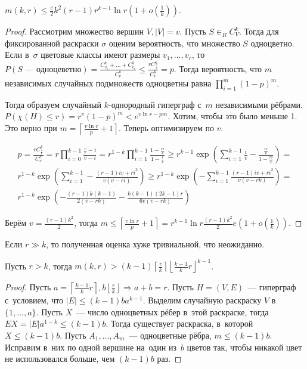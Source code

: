 \documentclass{article}
\begin{document}
\begin{lemma}
	$m(k, r) \le \frac{e}{2} k^2 (r-1) r^{k-1} \ln r (1 + o\left(\frac{1}{k}
	\right))$.
\end{lemma}
\begin{proof}
	Рассмотрим множество вершин $V, |V| = v$. Пусть $S \in_R C_V^k$. Тогда для
	фиксированной раскраски $\sigma$ оценим вероятность, что множество $S$
	одноцветно. Если в~$\sigma$ цветовые классы имеют размеры $v_1, \ldots, v_r$,
	то $P(S\text{~--- одноцеветно}) = \frac{C_{v_1}^k + \ldots + C_{v_r}^k}{C_v^k}
	\le \frac{r C_{\frac{v}{r}}^k}{C_v^k} = p$. Тогда вероятность, что $m$
	независимых случайных подмножеств одноцветны равна $\prod\limits_{i=1}^m
	(1-p)^m$.

	Тогда образуем случайный $k$-однородный гиперграф с~$m$ независимыми рёбрами.
	$P(\chi(H) \le r) = r^v (1-p)^m < e^{v \ln r - pm}$. Хотим, чтобы это было
	меньше 1. Это верно при $m = \left\lceil \frac{v \ln r}{p} + 1\right\rceil$.
	Теперь оптимизируем по $v$.

	\begin{multline*}
		p = \frac{r C_{\frac{v}{r}}^k}{C_v^k} = r \prod\limits_{i=0}^{k-1}
		\frac{\frac{v}{r} - i}{v - i} = r^{1-k} \prod\limits_{i=1}^{k-1} \frac{1 -
		\frac{ri}{v}}{1 - \frac{i}{v}} \ge r^{k-1} \exp\left(\sum\limits_{i=1}^{k-1}
		\frac{i}{v} - \frac{\frac{ri}{v}}{1 - \frac{ri}{v}}\right) =\\ r^{1-k}
		\exp\left( \sum\limits_{i=1}^{k-1} -\frac{(r-1)iv + ri^2}{v(v - ri)}\right)
		\ge r^{1-k} \exp\left( -\sum\limits_{i=1}^{k-1} \frac{(r-1)iv +
		ri^2}{v(v-rk)}\right) = \\ r^{1-k} \exp\left( -\frac{(r-1)k(k-1)}{2(v-rk)} -
		\frac{k(k-1)(2k-1)r}{6v(v-rk)}\right)
	\end{multline*}

	Берём $v = \frac{(r-1)k^2}{2}$, тогда $m \le \left\lceil \frac{v \ln r}{p} + 1
	\right\rceil = r^{k-1} \ln r \frac{(r-1)k^2}{2} e(1 +
	o\left(\frac{1}{k}\right))$.
\end{proof}

Если $r \gg k$, то полученная оценка хуже тривиальной, что неожиданно.

\begin{theorem}
	Пусть $r > k$, тогда $m(k, r) > (k-1) \left\lceil \frac{r}{k} \right\rceil
	\left\lfloor \frac{k-1}{k} r\right\rfloor^{k-1}$.
\end{theorem}
\begin{proof}
	Пусть $a = \left\lceil \frac{k-1}{k}r\right\rceil, b \left\lfloor \frac{r}{k}
	\right\rfloor \Rightarrow a + b = r$. Пусть $H = (V, E)$~--- гиперграф
	с~условием, что $|E| \le (k-1)b a^{k-1}$. Выделим случайную раскраску $V$
	в~$\{1, \ldots, a\}$. Пусть $X$~--- число одноцветных рёбер в~этой раскраске,
	тогда $EX = |E| a^{1-k} \le (k - 1)b$. Тогда существует раскраска, в~которой
	$X \le (k - 1)b$. Пусть $A_1, \ldots, A_m$~--- одноцветные рёбра, $m \le (k -
	1)b$. Исправим в~них по одной вершине на~один из~$b$ цветов так, чтобы никакой
	цвет не использовался больше, чем $(k - 1)b$ раз.
\end{proof}
\end{document}
